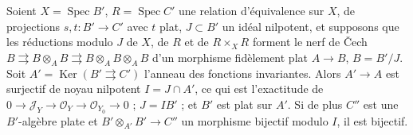 \begin{encadre}
\begin{theoreme*}
Soient $X = \operatorname{Spec} B'$, $R = \operatorname{Spec} C'$ une relation d'équivalence sur $X$, de projections $s, t : B' \to C'$ avec $t$ plat, $J \subset B'$ un idéal nilpotent, et supposons que les réductions modulo $J$ de $X$, de $R$ et de $R \times_X R$ forment le nerf de Čech $B \rightrightarrows B \otimes_A B \rightrightarrows B \otimes_A B \otimes_A B$ d'un morphisme fidèlement plat $A \to B$, $B = B'/J$. Soit $A' = \operatorname{Ker}(B' \rightrightarrows C')$ l'anneau des fonctions invariantes. Alors $A' \to A$ est surjectif de noyau nilpotent $I = J \cap A'$, ce qui est l'exactitude de $0 \to \mathcal J_Y \to \mathcal O_Y \to \mathcal O_{Y_0} \to 0$ ; $J = I B'$ ; et $B'$ est plat sur $A'$. Si de plus $C''$ est une $B'$-algèbre plate et $B' \otimes_{A'} B' \to C''$ un morphisme bijectif modulo $I$, il est bijectif.
\end{theoreme*}
\end{encadre}
